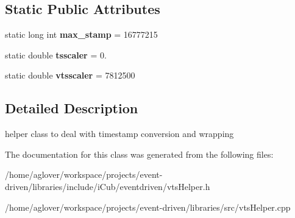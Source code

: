 \subsection*{Static Public Attributes}
\begin{DoxyCompactItemize}
\item 
static long int {\bfseries max\+\_\+stamp} = 16777215\hypertarget{classev_1_1vtsHelper_a90d44d8ec100b8bd154bf7c87e895d17}{}\label{classev_1_1vtsHelper_a90d44d8ec100b8bd154bf7c87e895d17}

\item 
static double {\bfseries tsscaler} = 0.\hypertarget{classev_1_1vtsHelper_ad3ad427d18c24f9655bbc73295abf678}{}\label{classev_1_1vtsHelper_ad3ad427d18c24f9655bbc73295abf678}

\item 
static double {\bfseries vtsscaler} = 7812500\hypertarget{classev_1_1vtsHelper_afa2dd46ae7113668bc6ebea88ab8fa11}{}\label{classev_1_1vtsHelper_afa2dd46ae7113668bc6ebea88ab8fa11}

\end{DoxyCompactItemize}


\subsection{Detailed Description}
helper class to deal with timestamp conversion and wrapping 

The documentation for this class was generated from the following files\+:\begin{DoxyCompactItemize}
\item 
/home/aglover/workspace/projects/event-\/driven/libraries/include/i\+Cub/eventdriven/vts\+Helper.\+h\item 
/home/aglover/workspace/projects/event-\/driven/libraries/src/vts\+Helper.\+cpp\end{DoxyCompactItemize}
